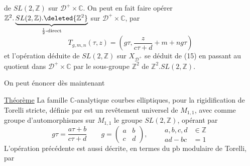 de $SL(2,\mathbb Z)$ sur $\mathcal D^+\times\mathbb C$. On peut en fait faire opérer $\mathbb Z^2.\underbrace{SL(2,\mathbb Z).\deleted{\mathbb Z^2}}_{\text{$\frac12$-direct}}$ sur $\mathcal D^+\times\mathbb C$, par
\[
T_{g,m,n}(\tau,z)=\left(g\tau,\frac{z}{c\tau+d}+m+ng\tau\right) \tag*{(15)}
\]
et l'opération déduite de $SL(2,\mathbb Z)$ sur $X_{\mathcal D^+}$ se déduit de (15) en passant au quotient  dans $\mathcal D^+\times\mathbb C$ par le sous-groupe $\mathbb Z^2$ de $\mathbb Z^2.SL(2,\mathbb Z)$.

On peut énoncer dès maintenant

\uline{Théorème} La famille $\mathbb C$-analytique  courbes elliptiques,  pour la rigidification de Torelli stricte, définie par
est un revêtement universel de $M_{1,1}$, avec  comme groupe d'automorphismes sur $M_{1,1}$ le groupe $SL(2,\mathbb Z)$, opérant par
\[
g\tau=\frac{a\tau+b}{c\tau+d}\qquad g=\begin{pmatrix}a&b\\c&d\end{pmatrix},\qquad\begin{aligned}a,b,c,d&\in\mathbb Z\\ad-bc&=1\end{aligned}
\]
L'opération précédente est aussi décrite, en termes du pb modulaire de Torelli, par
